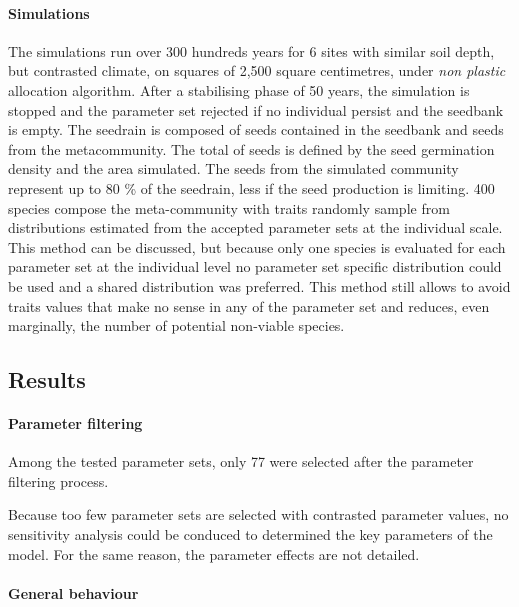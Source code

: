 \paragraph{Simulations}
The simulations run over 300 hundreds years for 6 sites with similar soil depth, but contrasted climate, on squares of 2,500 square centimetres, under \textit{non plastic} allocation algorithm. After a stabilising phase of 50 years, the simulation is stopped and the parameter set rejected if no individual persist and the seedbank is empty. The seedrain is composed of seeds contained in the seedbank and seeds from the metacommunity. The total of seeds is defined by the seed germination density and the area simulated. The seeds from the simulated community represent up to 80 \% of the seedrain, less if the seed production is limiting. 400 species compose the meta-community with traits randomly sample from distributions estimated from the accepted parameter sets at the individual scale. This method can be discussed, but because only one species is evaluated for each parameter set at the individual level no parameter set specific distribution could be used and a shared distribution was preferred. This method still allows to avoid traits values that make no sense in any of the parameter set and reduces, even marginally, the number of potential non-viable species.



\subsection{Results}


\paragraph{Parameter filtering}

Among the  tested parameter sets, only 77 were selected after the parameter filtering process. 

Because too few parameter sets are selected with contrasted parameter values, no sensitivity analysis could be conduced to determined the key parameters of the model. For the same reason, the parameter effects are not detailed.

\paragraph{General behaviour}

